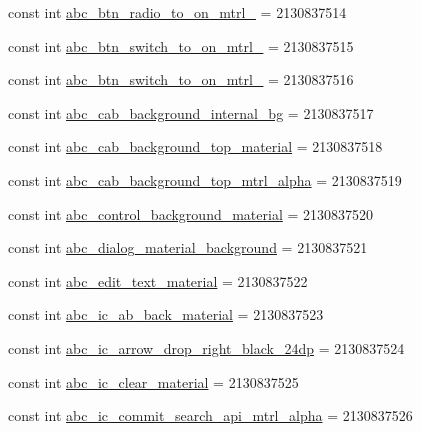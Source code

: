 \begin{CompactItemize}
\item 
const int \hyperlink{class__2doo_1_1_droid_1_1_resource_1_1_drawable_20d2e3c5b0f4f1e826c589a1da16a7b1}{abc\_\-btn\_\-radio\_\-to\_\-on\_\-mtrl\_} = 2130837514
\item 
const int \hyperlink{class__2doo_1_1_droid_1_1_resource_1_1_drawable_f61e59c49e189f4a73ed7276ad9f7ceb}{abc\_\-btn\_\-switch\_\-to\_\-on\_\-mtrl\_} = 2130837515
\item 
const int \hyperlink{class__2doo_1_1_droid_1_1_resource_1_1_drawable_e4e06c2edb3fa206681f38cce0c81dd8}{abc\_\-btn\_\-switch\_\-to\_\-on\_\-mtrl\_} = 2130837516
\item 
const int \hyperlink{class__2doo_1_1_droid_1_1_resource_1_1_drawable_fae26c068d300aba8ce82c13e6e58bff}{abc\_\-cab\_\-background\_\-internal\_\-bg} = 2130837517
\item 
const int \hyperlink{class__2doo_1_1_droid_1_1_resource_1_1_drawable_a7e59415ee41ca910ac2aef728be461e}{abc\_\-cab\_\-background\_\-top\_\-material} = 2130837518
\item 
const int \hyperlink{class__2doo_1_1_droid_1_1_resource_1_1_drawable_01d77c6bf8163271d44e7e38bcc39eaf}{abc\_\-cab\_\-background\_\-top\_\-mtrl\_\-alpha} = 2130837519
\item 
const int \hyperlink{class__2doo_1_1_droid_1_1_resource_1_1_drawable_15f3ed9c5374556cc95e5af465c91c43}{abc\_\-control\_\-background\_\-material} = 2130837520
\item 
const int \hyperlink{class__2doo_1_1_droid_1_1_resource_1_1_drawable_28f44e4b902adc02c6e6ddbdd0e002e1}{abc\_\-dialog\_\-material\_\-background} = 2130837521
\item 
const int \hyperlink{class__2doo_1_1_droid_1_1_resource_1_1_drawable_c8ddac316ccc8f0107611b19b4f4327c}{abc\_\-edit\_\-text\_\-material} = 2130837522
\item 
const int \hyperlink{class__2doo_1_1_droid_1_1_resource_1_1_drawable_66c6f6dc8fb8aaa87795ad1232b1df84}{abc\_\-ic\_\-ab\_\-back\_\-material} = 2130837523
\item 
const int \hyperlink{class__2doo_1_1_droid_1_1_resource_1_1_drawable_2a087f89f47007d9d4c3e225c1d96527}{abc\_\-ic\_\-arrow\_\-drop\_\-right\_\-black\_\-24dp} = 2130837524
\item 
const int \hyperlink{class__2doo_1_1_droid_1_1_resource_1_1_drawable_66fd217f2b813ce36b85cb81ecadfd02}{abc\_\-ic\_\-clear\_\-material} = 2130837525
\item 
const int \hyperlink{class__2doo_1_1_droid_1_1_resource_1_1_drawable_ab49f082220d226726f023f8c71d3c86}{abc\_\-ic\_\-commit\_\-search\_\-api\_\-mtrl\_\-alpha} = 2130837526

\end{CompactItemize}
